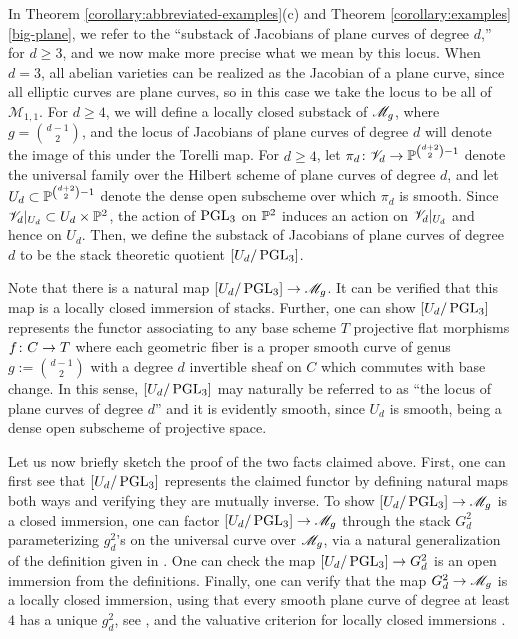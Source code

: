 \begin{remark}
	\label{remark:locus-of-plane-curves}
	In Theorem \ref{corollary:abbreviated-examples}(c) and Theorem \ref{corollary:examples}\autoref{big-plane},
	we refer to the ``substack of Jacobians of plane curves of degree $d$,'' for $d \geq 3$,
	and we now make more precise what we mean
	by this locus.
	When $d=3$, all abelian varieties can be realized as the Jacobian of a plane curve,
	since all elliptic curves are plane curves, so in this case we take the locus to be all of $\mathscr M_{1,1}$.
	For $d \geq 4$, we will define a locally closed substack of ${\mathscr M_g}$, where $g = \binom{d-1}{2}$,
	and the locus of Jacobians of plane curves of degree $d$ will denote the image of this under the Torelli map.
	For $d \geq 4$, let $\pi_d\colon \mathscr V_d \rightarrow {\mathbb P}^{\binom{d+2}{2}-1}$ denote the universal family over 
	the Hilbert scheme of plane curves of degree $d$,
	and let $U_d \subset {\mathbb P}^{\binom{d+2}{2}-1}$ denote the dense open subscheme 
	over which $\pi_d$ is smooth.
	Since $\mathscr V_d|_{U_d} \subset U_d \times {\mathbb P}^2$,
	the action of $\operatorname{PGL}_3$ on ${\mathbb P}^2$ induces an action on $\mathscr V_d|_{U_d}$ and hence on $U_d$.
	Then, we define the substack of Jacobians of plane curves of degree $d$
	to be the stack theoretic quotient $[U_d/\operatorname{PGL}_3]$.
	
	Note that there is a natural map $[U_d/\operatorname{PGL}_3] \rightarrow {\mathscr M_g}$.
	It can be verified that this map is a locally closed immersion of stacks. Further, one
	can show $[U_d/\operatorname{PGL}_3]$ represents the functor associating to any base scheme $T$
	projective flat morphisms $f \colon C \rightarrow T$ where each geometric fiber is a proper smooth curve of genus $g := \binom{d-1}{2}$
	with a degree $d$ invertible sheaf on $C$ which commutes with base change.	
	In this sense, $[U_d/\operatorname{PGL}_3]$ may naturally be referred to as ``the locus of plane curves of degree $d$''
	and it is evidently smooth, since $U_d$ is smooth, being a dense open subscheme of projective space.

	Let us now briefly sketch the proof of the two facts claimed above.
	First, one can first see that $[U_d/\operatorname{PGL}_3]$ represents the claimed
	functor by defining natural maps both ways and verifying they are mutually inverse.
	To show $[U_d/\operatorname{PGL}_3] \rightarrow {\mathscr M_g}$ is a closed immersion,
	one can factor $[U_d/\operatorname{PGL}_3] \rightarrow {\mathscr M_g}$ through the stack $G^2_d$ parameterizing $g^2_d$'s on 
	the universal curve over ${\mathscr M_g}$,
	via a natural generalization of the definition given in \cite[Chapter XXI, Definition 3.12]{ACMG:geometryOfCurves}.
	One can check the map $[U_d/\operatorname{PGL}_3] \rightarrow G^2_d$ is an open immersion from the definitions.
	Finally, one can verify that the map $G^2_d \rightarrow {\mathscr M_g}$ is a locally closed immersion, using that
	every smooth plane curve of degree at least $4$ has a unique $g^2_d$, see \cite[Appendix A, Exercises 17 and 18]{ACGH:I},
	and the valuative criterion for locally closed immersions \cite[Chapter 1, Corollary 2.13]{mochizuki2014foundations}.
\end{remark}

